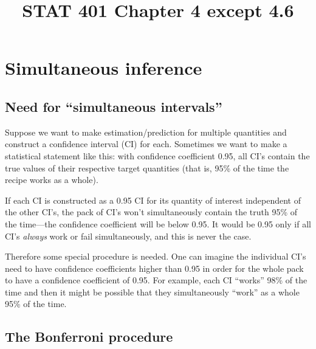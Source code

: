 \documentclass[12pt]{article}
\begin{document}
\title{STAT 401 Chapter 4 except 4.6}
\maketitle

\section{Simultaneous inference}

\subsection{Need for ``simultaneous intervals''}

Suppose we want to make estimation/prediction for multiple quantities
and construct a confidence interval (CI) for each.
Sometimes we want to make a statistical statement like this:
with confidence coefficient 0.95,
all CI's contain the true values of their respective target quantities
(that is, 95\% of the time the recipe works as a whole).

If each CI is constructed as a 0.95 CI for its quantity of interest
independent of the other CI's, the pack of CI's won't simultaneously
contain the truth 95\% of the time---the confidence coefficient will be
below 0.95. It would be 0.95 only if all CI's \emph{always} work or fail
simultaneously, and this is never the case.

Therefore some special procedure is needed.
One can imagine the individual CI's need to have confidence coefficients
higher than 0.95 in order for the whole pack to have a confidence
coefficient of 0.95.
For example, each CI ``works'' 98\% of the time
and then it might be possible that they simultaneously ``work'' as a
whole 95\% of the time.


\subsection{The Bonferroni procedure}
\end{document}

